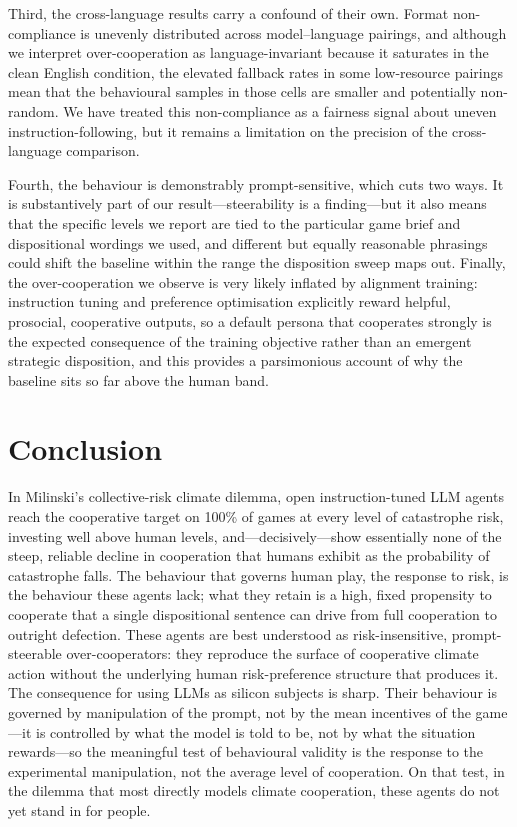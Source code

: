 \documentclass[openacc]{rsproca_new}
\begin{document}
Third, the cross-language results carry a confound of their own. Format non-compliance is unevenly distributed across model--language pairings, and although we interpret over-cooperation as language-invariant because it saturates in the clean English condition, the elevated fallback rates in some low-resource pairings mean that the behavioural samples in those cells are smaller and potentially non-random. We have treated this non-compliance as a fairness signal about uneven instruction-following, but it remains a limitation on the precision of the cross-language comparison.

Fourth, the behaviour is demonstrably prompt-sensitive, which cuts two ways. It is substantively part of our result---steerability is a finding---but it also means that the specific levels we report are tied to the particular game brief and dispositional wordings we used, and different but equally reasonable phrasings could shift the baseline within the range the disposition sweep maps out. Finally, the over-cooperation we observe is very likely inflated by alignment training: instruction tuning and preference optimisation explicitly reward helpful, prosocial, cooperative outputs, so a default persona that cooperates strongly is the expected consequence of the training objective rather than an emergent strategic disposition, and this provides a parsimonious account of why the baseline sits so far above the human band.

\section{Conclusion}

In Milinski's collective-risk climate dilemma, open instruction-tuned LLM agents reach the cooperative target on 100\% of games at every level of catastrophe risk, investing well above human levels, and---decisively---show essentially none of the steep, reliable decline in cooperation that humans exhibit as the probability of catastrophe falls. The behaviour that governs human play, the response to risk, is the behaviour these agents lack; what they retain is a high, fixed propensity to cooperate that a single dispositional sentence can drive from full cooperation to outright defection. These agents are best understood as risk-insensitive, prompt-steerable over-cooperators: they reproduce the surface of cooperative climate action without the underlying human risk-preference structure that produces it. The consequence for using LLMs as silicon subjects is sharp. Their behaviour is governed by manipulation of the prompt, not by the mean incentives of the game---it is controlled by what the model is told to be, not by what the situation rewards---so the meaningful test of behavioural validity is the response to the experimental manipulation, not the average level of cooperation. On that test, in the dilemma that most directly models climate cooperation, these agents do not yet stand in for people.
\end{document}
